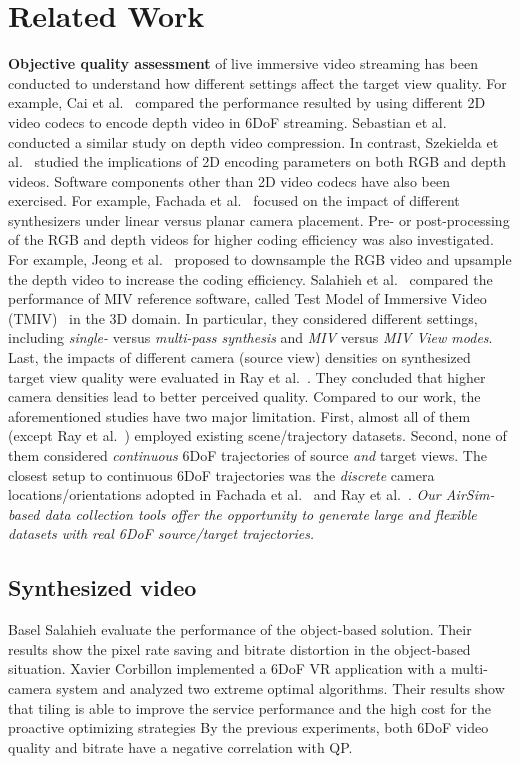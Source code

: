 \section{Related Work} \label{sec:related}

{\bf Objective quality assessment} of live immersive video streaming has been
conducted to understand how different settings affect the target view quality.
For example, Cai et al.~\cite{CWQP+21} compared the performance resulted by
using different 2D video codecs to encode depth video in 6DoF streaming. 
Sebastian et al.~\cite{SH17} conducted a similar
study on depth video compression.  In contrast, Szekielda et al.~\cite{SDM21}
studied the implications of 2D encoding parameters on both RGB and depth
videos. Software components other than 2D video codecs have also been
exercised. For example, Fachada et al.~\cite{FBSL18} focused on the impact of
different synthesizers under linear versus planar camera placement.  Pre- or
post-processing of the RGB and depth videos for higher coding efficiency was
also investigated. For example, Jeong et al.~\cite{JLRL+20} proposed to
downsample the RGB video and upsample the depth video to increase the coding
efficiency.  Salahieh et al.~\cite{SBB19} compared the performance of MIV
reference software, called Test Model of Immersive Video (TMIV)~\cite{tmiv_doc}
in the 3D domain. In particular, they considered different settings, including
{\em single-} versus {\em multi-pass synthesis} and {\em MIV} versus {\em MIV
View modes}. 
Last, the impacts of
different camera (source view) densities on synthesized target view quality
were evaluated in Ray et al.~\cite{RJL18}. They concluded that higher camera
densities lead to better perceived quality. Compared to our work, the
aforementioned studies have two major limitation. First, almost all of them (except Ray et al.~\cite{RJL18})
employed existing scene/trajectory datasets. 
Second, none of them considered  {\em continuous} 6DoF trajectories of
source {\em and} target views. The closest setup to continuous 6DoF
trajectories was the {\em discrete} camera locations/orientations adopted in Fachada
et al.~\cite{FBSL18} and Ray et al.~\cite{RJL18}. {\em Our AirSim-based data
collection tools offer the opportunity to generate large and flexible datasets
with real 6DoF source/target trajectories.}

\subsection{Synthesized video}
Basel Salahieh \cite{SCB21} evaluate the performance of the object-based solution. Their results show the pixel rate saving and bitrate distortion in the object-based situation.
Xavier Corbillon \cite{CDSF18} implemented a 6DoF VR application with a multi-camera system and analyzed two extreme optimal algorithms. Their results show that tiling is able to improve the service performance and the high cost for the proactive optimizing strategies
By the previous experiments, both 6DoF video quality and bitrate have a negative correlation with QP.